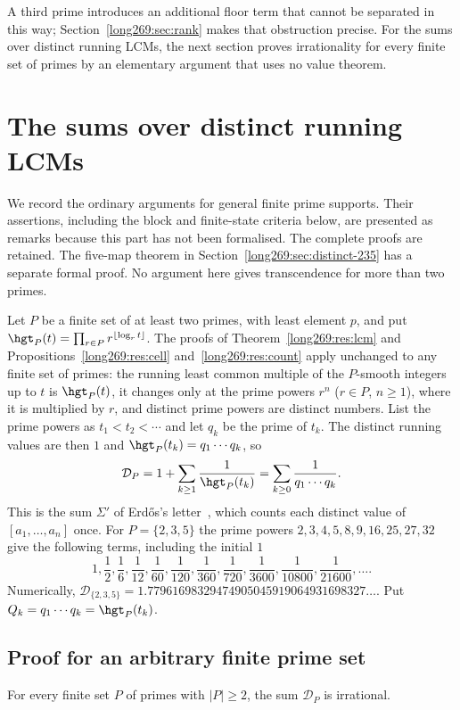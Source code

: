 A third prime introduces an additional floor term that cannot be separated
in this way; Section~\ref{long269:sec:rank} makes that obstruction precise.
For the sums over distinct running LCMs, the next section proves irrationality for
every finite set of primes by an elementary argument that uses no value
theorem.

\section{The sums over distinct running LCMs}
\label{long269:sec:distinct}

We record the ordinary arguments for general finite prime supports.
Their assertions, including the block and finite-state criteria below,
are presented as remarks because this part has not been formalised.
The complete proofs are retained. The five-map theorem in
Section~\ref{long269:sec:distinct-235} has a separate formal proof.
No argument here gives transcendence for more than two primes.

Let $P$ be a finite set of at least two primes, with least element $p$, and
put $\hgt_P(t)=\prod_{r\in P}r^{\lfloor\log_rt\rfloor}$.  The proofs of
Theorem~\ref{long269:res:lcm} and Propositions~\ref{long269:res:cell}
and~\ref{long269:res:count} apply unchanged to any finite set of primes: the
running least common multiple of the $P$-smooth integers up to $t$ is
$\hgt_P(t)$, it changes only at the prime powers $r^n$ ($r\in P$, $n\ge1$),
where it is multiplied by $r$, and distinct prime powers are distinct
numbers.  List the prime powers as $t_1<t_2<\cdots$ and let $q_k$ be the prime
of $t_k$.  The distinct running values are then $1$ and
$\hgt_P(t_k)=q_1\cdots q_k$, so
\begin{equation}\label{long269:eq:distinct-sum}
 \mathcal D_P=1+\sum_{k\ge1}\frac1{\hgt_P(t_k)}
 =\sum_{k\ge0}\frac1{q_1\cdots q_k}.
\end{equation}
This is the sum $\Sigma'$ of Erd\H{o}s's letter~\cite{erdos1974letter},
which counts each distinct value of $[a_1,\ldots,a_n]$ once.  For
$P=\{2,3,5\}$ the prime powers $2,3,4,5,8,9,16,25,27,32$ give the following terms,
including the initial $1$
\[
 1,\frac12,\frac16,\frac1{12},\frac1{60},\frac1{120},\frac1{360},\frac1{720},
 \frac1{3600},\frac1{10800},\frac1{21600},\ldots .
\]
Numerically, $\mathcal D_{\{2,3,5\}}=1.77961698329474905045919064931698327\ldots$.
Put $Q_k=q_1\cdots q_k=\hgt_P(t_k)$.

\subsection{Proof for an arbitrary finite prime set}\label{long269:sec:distinct-all}
\begin{remark}\label{long269:res:distinct-height-all}
For every finite set $P$ of primes with $|P|\ge2$, the sum $\mathcal D_P$
is irrational.
\end{remark}

